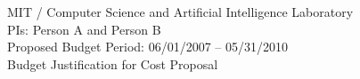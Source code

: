 \def\piA{Person A }
\def\piB{Person B }
\def\numRAs{2 }
\def\pilist{PIs: \piA and \piB}
\def\thisyear{2006}
\def\startdate{06/01/2007 }
\def\enddate{05/31/2010 }
\def\phdstipend{\$2,125/mo }
\def\mscstipend{\$1,940/mo }
\def\studraise{4\% }
\def\salaryallocationrate{8.34\%} %
\def\employeebenefitrate{27.0\% }
\def\vacationaccrualrate{9.5\% }
\def\networkservicescost{\$100/person/month }
\def\networkfacilitycharges{\$150/person/month} %
\def\MITninemonthtuition{\$33,400} %
\def\MITtuitioninflator{4\% }
\def\MITtuitionsubsidy{45\% }
\def\MITtuitioncharge{55\% }
\def\msAllocation{1.24\%}
\def\facostinception{07/01/2006} %
\def\facostrate{65\% }

\renewcommand{\theenumi}{\Alph{enumi}}
\renewcommand{\theenumii}{\arabic{enumii}}

\vspace*{1.0in}
\begin{center}
{\large
MIT / Computer Science and Artificial Intelligence Laboratory \\
\pilist \\
Proposed Budget Period: \startdate -- \enddate \\
Budget Justification for Cost Proposal
}
\end{center}


